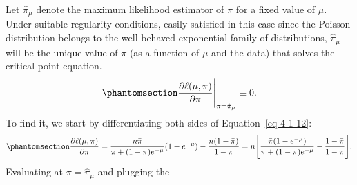 \documentclass[
  12pt]{article}
\begin{document}
Let \(\hat{\pi}_{\mu}\) denote the maximum likelihood estimator of
\(\pi\) for a fixed value of \(\mu\). Under suitable regularity
conditions, easily satisfied in this case since the Poisson distribution
belongs to the well-behaved exponential family of distributions,
\(\hat{\pi}_{\mu}\) will be the unique value of \(\pi\) (as a function
of \(\mu\) and the data) that solves the critical point equation.
\begin{equation}\phantomsection\label{eq-4-1-13}{
\frac{\partial \ell(\mu, \pi)}{\partial\pi}\Bigg|_{\pi = \hat{\pi}_{\mu}} \equiv 0.
}\end{equation} To find it, we start by differentiating both sides of
Equation~\ref{eq-4-1-12}:
\begin{equation}\phantomsection\label{eq-4-1-13}{
\frac{\partial \ell(\mu, \pi)}{\partial\pi} = \frac{n \bar{\pi}}{\pi + (1-\pi)e^{-\mu}}(1 - e^{-\mu}) - \frac{n(1 - \bar{\pi})}{1 - \pi}
                                            = n \Bigg[\frac{\bar{\pi}(1 - e^{-\mu})}{\pi + (1-\pi)e^{-\mu}} - \frac{1 - \bar{\pi}}{1 - \pi} \Bigg].
}\end{equation} Evaluating at \(\pi = \hat{\pi}_{\mu}\) and plugging the
\end{document}
